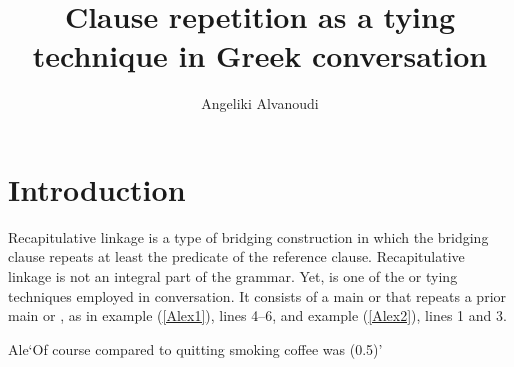 \documentclass[output=paper]{LSP/langsci}
\author{
   Angeliki Alvanoudi\affiliation{Aristotle University of Thessaloniki and James Cook University}
}
\title{Clause repetition as a tying technique in Greek conversation}
\begin{document}
\section{Introduction} 
\label{AlIntroduction}
Recapitulative linkage is a type of bridging construction in which the bridging clause repeats at least the predicate of the reference clause. Recapitulative linkage is not an integral part of the  grammar. Yet,  is one of the  or tying techniques employed in  conversation. It consists of a main or  that repeats a prior main or , as in example (\ref{Alex1}), lines 4--6, and example (\ref{Alex2}), lines 1 and 3.  

\clearpage
\begin{Transcript}{Ale}{‘Of course compared to quitting smoking coffee was (0.5)’}
\label{Alex1}
\\
\\
\\
\\    
\\         
\\               
\end{Transcript}
\end{document}
